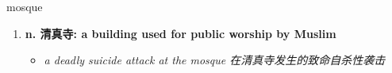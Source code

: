 
\begin{frame}
{\huge mosque}
\begin{center}
\begin{enumerate}\Large
  \item \textbf{n. 清真寺: a building used for public worship by Muslim}
  \begin{itemize}
    \item \em{\Large{a deadly suicide attack at the mosque 在清真寺发生的致命自杀性袭击}}
  \end{itemize}
\end{enumerate}
\end{center}
\end{frame}

